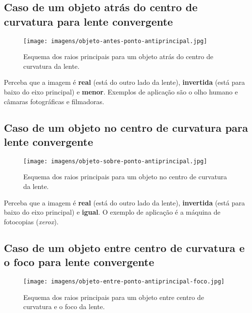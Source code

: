 \documentclass[12pt]{extarticle}
\newcommand{\<}{\langle}
\renewcommand{\>}{\rangle}
\theoremstyle{definition}
\begin{document}
\subsection{Caso de um objeto atrás do centro de curvatura para lente convergente}
\begin{figure}[H]
    \centering
    \texttt{[image: imagens/objeto-antes-ponto-antiprincipal.jpg]}
    \caption{Esquema dos raios principais para um objeto atrás do centro de curvatura da lente.\cite{mundoeducacao}}
    \label{fig:obj_antes_centro}
\end{figure}

Perceba que a imagem é \textbf{real} (está do outro lado da lente), \textbf{invertida} (está para baixo do eixo principal) e \textbf{menor}. Exemplos de aplicação são o olho humano e câmaras fotográficas e filmadoras.

\subsection{Caso de um objeto no centro de curvatura para lente convergente}

\begin{figure}[H]
    \centering
    \texttt{[image: imagens/objeto-sobre-ponto-antiprincipal.jpg]}
    \caption{Esquema dos raios principais para um objeto no centro de curvatura da lente. \cite{mundoeducacao}}
    \label{fig:obj_no_centro}
\end{figure}

Perceba que a imagem é \textbf{real} (está do outro lado da lente), \textbf{invertida} (está para baixo do eixo principal) e \textbf{igual}. O exemplo de aplicação é a máquina de fotocopias (\textit{xerox}).

\subsection{Caso de um objeto entre centro de curvatura e o foco para lente convergente}

\begin{figure}[H]
    \centering
    \texttt{[image: imagens/objeto-entre-ponto-antiprincipal-foco.jpg]}
    \caption{Esquema dos raios principais para um objeto entre centro de curvatura e o foco da lente. \cite{mundoeducacao}}
    \label{fig:obj_entre_centro_foco}
\end{figure}
\end{document}

